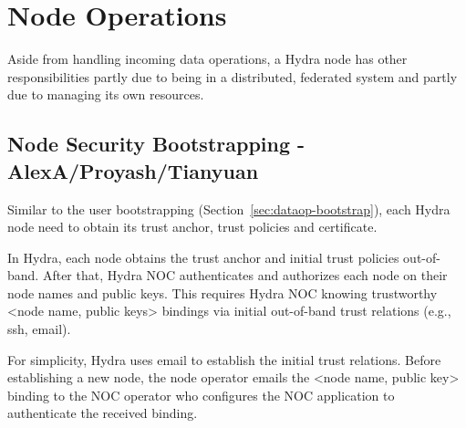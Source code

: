 \section{Node Operations} \label{sec:node-operations}

Aside from handling incoming data operations, a Hydra node has other responsibilities partly due to being in a distributed, federated system and partly due to managing its own resources.

\subsection{Node Security Bootstrapping - AlexA/Proyash/Tianyuan}
\label{sec:nodeop-boostrap}
Similar to the user bootstrapping (Section~\ref{sec:dataop-bootstrap}), each Hydra node need to obtain its trust anchor, trust policies and certificate.

In Hydra, each node obtains the trust anchor and initial trust policies out-of-band.
After that, Hydra NOC authenticates and authorizes each node on their node names and public keys.
This requires Hydra NOC knowing trustworthy <node name, public keys> bindings via initial out-of-band trust relations (e.g., ssh, email).%

For simplicity, Hydra uses email to establish the initial trust relations.
Before establishing a new node, the node operator emails the <node name, public key> binding to the NOC operator who configures the NOC application to authenticate the received binding.

